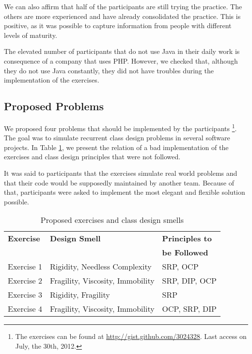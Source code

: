 \documentclass[times]{speauth}
\begin{document}
We can also affirm that half of the participants are still trying the practice. The others
are more experienced and have already consolidated the practice. This is positive, as it
was possible to capture information from people with different levels of maturity.

The elevated number of participants that do not use Java in their daily work is consequence
of a company that uses PHP. However, we checked that, although they do not use Java constantly,
they did not have troubles during the implementation of the exercises.

\subsection{Proposed Problems}
\label{sec:exercicios}

We proposed four problems that should be implemented by the participants
\footnote{The exercises can be found at \url{http://gist.github.com/3024328}. Last access on July, the 30th, 2012.}. 
The goal was to simulate recurrent class design problems in several software projects.
In Table \ref{tab:problemas-exercicios}, we present the relation of a bad implementation of
the exercises and class design principles that were not followed.

It was said to participants that the exercises simulate real world problems and that their code
would be supposedly maintained by another team. Because of that, participants were asked to
implement the most elegant and flexible solution possible.

\begin{table}
	\centering
	\begin{tabular}{| p{3cm} | p{6cm} | p{3cm} | }
		\hline
		\textbf{Exercise} & \textbf{Design Smell} & \textbf{Principles to}\\
		& & \textbf{be Followed}\\
		
		\hline
		
		Exercise 1 & Rigidity, Needless Complexity & SRP, OCP \\
		Exercise 2 & Fragility, Viscosity, Immobility & SRP, DIP, OCP \\
		Exercise 3 & Rigidity, Fragility & SRP\\
		Exercise 4 & Fragility, Viscosity, Immobility & OCP, SRP, DIP \\
		
		\hline
	\end{tabular}
	\caption{Proposed exercises and class design smells}
	\label{tab:problemas-exercicios}
\end{table}
\end{document}
